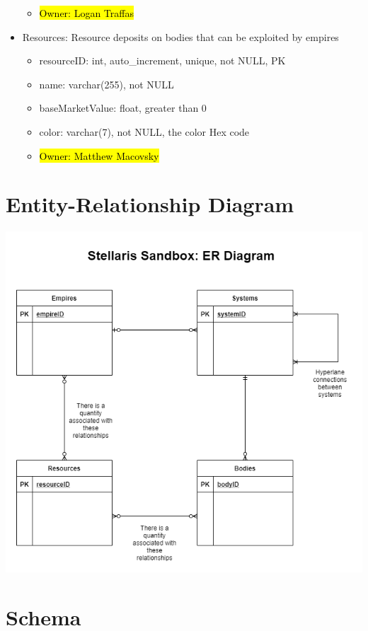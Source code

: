 \documentclass[12pt]{article}
\let\Oldsection\section
\renewcommand{\section}{\FloatBarrier\Oldsection}
\begin{document}
\begin{itemize}
\begin{itemize}
        \item \hl{Owner: Logan Traffas}
    \end{itemize}
    \item Resources: Resource deposits on bodies that can be exploited by empires
    \begin{itemize}
        \item resourceID: int, auto\_increment, unique, not NULL, PK
        \item name: varchar(255), not NULL
        \item baseMarketValue: float, greater than 0
        \item color: varchar(7), not NULL, the color Hex code
        \item \hl{Owner: Matthew Macovsky}
    \end{itemize}
\end{itemize}

\newpage
\section{Entity-Relationship Diagram}

\includegraphics[width=\textwidth]{erd.png}

\newpage
\section{Schema}
\end{document}
